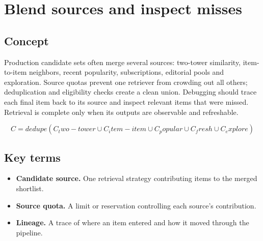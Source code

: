 \section{Blend sources and inspect misses}

\begin{abstract}
One retriever rarely covers every intent, item age and failure mode.
\end{abstract}

\subsection{Concept}
Production candidate sets often merge several sources: two-tower similarity, item-to-item neighbors, recent popularity, subscriptions, editorial pools and exploration. Source quotas prevent one retriever from crowding out all others; deduplication and eligibility checks create a clean union. Debugging should trace each final item back to its source and inspect relevant items that were missed. Retrieval is complete only when its outputs are observable and refreshable.

\begin{equation*}
C = dedupe(C_two-tower \cup C_item-item \cup C_popular \cup C_fresh \cup C_explore)
\end{equation*}

\subsection{Key terms}
\begin{itemize}
\item \textbf{Candidate source.} One retrieval strategy contributing items to the merged shortlist.
\item \textbf{Source quota.} A limit or reservation controlling each source’s contribution.
\item \textbf{Lineage.} A trace of where an item entered and how it moved through the pipeline.
\end{itemize}
